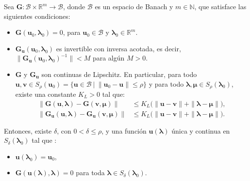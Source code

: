 \begin{theorem}
    Sea $\mathbf{G} : \mathcal{B} \times \mathbb{R}^m \to \mathcal{B}$, donde
    $\mathcal{B}$ es un espacio de Banach y $m \in \mathbb{N}$, que satisface
    las siguientes condiciones:

    \begin{itemize}
        \item $ \mathbf{G}(\mathbf{u}_0, \boldsymbol{\lambda}_0) = 0 $, para
              $ \mathbf{u}_0 \in \mathcal{B} $ y $ \boldsymbol{\lambda}_0 \in \mathbb{R}^m $.

        \item $ \mathbf{G}_{\mathbf{u}}(\mathbf{u}_0, \boldsymbol{\lambda}_0) $ es
              invertible con inversa acotada, es decir,
              $ \|\mathbf{G}_{\mathbf{u}}(\mathbf{u}_0, \boldsymbol{\lambda}_0)^{-1} \| < M $
              para algún $ M > 0 $.

        \item $\mathbf{G}$ y $\mathbf{G}_{\mathbf{u}}$ son continuas de Lipschitz. En particular,
              para todo $\mathbf{u}, \mathbf{v} \in S_\rho(\mathbf{u}_0) = \{\mathbf{u} \in
                  \mathcal{B}\ |\ \|\mathbf{u}_0 - \mathbf{u}\| \leq \rho \} $ y para todo
              $\boldsymbol{\lambda}, \boldsymbol{\mu} \in S_\rho(\boldsymbol{\lambda}_0)$,
              existe una constante $K_L > 0$ tal que:
              \begin{align*}
                  \| \mathbf{G}(\mathbf{u},\boldsymbol{\lambda}) - \mathbf{G}(\mathbf{v},\boldsymbol{\mu})\| & \leq
                  K_L\big(\|\mathbf{u}-\mathbf{v}\| + \|\boldsymbol{\lambda}-\boldsymbol{\mu}\|\big),                                                   \\[6pt]
                  \| \mathbf{G}_{\mathbf{u}}(\mathbf{u},\boldsymbol{\lambda}) - \mathbf{G}_{\mathbf{u}}(\mathbf{v},
                  \boldsymbol{\mu})\|                                                                        & \leq K_L\big(\|\mathbf{u}-\mathbf{v}\| +
                  \|\boldsymbol{\lambda}-\boldsymbol{\mu}\|\big).
              \end{align*}
    \end{itemize}

    Entonces, existe $\delta$, con $0 < \delta \leq \rho$, y una función
    $\mathbf{u}(\boldsymbol{\lambda})$ única y continua en $S_{\delta}(\boldsymbol{\lambda}_0)$
    tal que :
    \begin{itemize}
        \item $\mathbf{u}(\boldsymbol{\lambda}_0) = \mathbf{u}_0$,
        \item $\mathbf{G}(\mathbf{u}(\boldsymbol{\lambda}), \boldsymbol{\lambda}) = 0$
              para toda $ \boldsymbol{\lambda} \in S_{\delta}(\boldsymbol{\lambda}_0)$.
    \end{itemize}
    \label{th:IFT}
\end{theorem}

